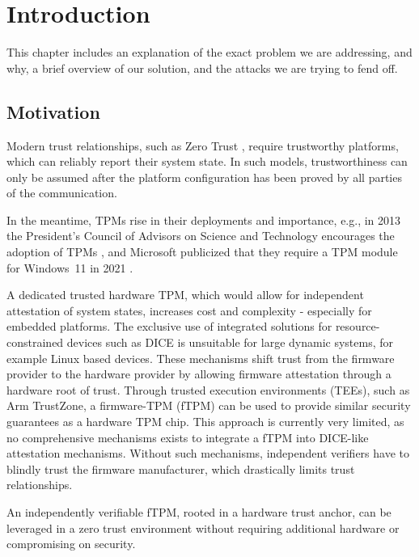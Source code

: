 
\chapter{Introduction}\label{chapter:introduction}

This chapter includes an explanation of the exact problem we are addressing, and why, a brief overview of our solution, and the attacks we are trying to fend off.


\section{Motivation}

Modern trust relationships, such as Zero Trust \cite{isaca2021}, require trustworthy platforms, which can reliably report their system state.
In such models, trustworthiness can only be assumed after the platform configuration has been proved by all parties of the communication.

In the meantime, TPMs rise in their deployments and importance, e.g., in 2013 the President's Council of Advisors on Science and Technology encourages the adoption of TPMs \cite{usa}, and Microsoft publicized that they require a TPM module for Windows~11 in 2021 \cite{win11req}.

A dedicated trusted hardware TPM, which would allow for independent attestation of system states, increases cost and complexity - especially for embedded platforms.
The exclusive use of integrated solutions for resource-constrained devices such as \ac{DICE} is unsuitable for large dynamic systems, for example Linux based devices.
These mechanisms shift trust from the firmware provider to the hardware provider by allowing firmware attestation through a hardware root of trust.
Through trusted execution environments (TEEs), such as Arm TrustZone, a firmware-TPM (fTPM) can be used to provide similar security guarantees as a hardware TPM chip.
This approach is currently very limited, as no comprehensive mechanisms exists to integrate a fTPM into DICE-like attestation mechanisms.
Without such mechanisms, independent verifiers have to blindly trust the firmware manufacturer, which drastically limits trust relationships.

An independently verifiable fTPM, rooted in a hardware trust anchor, can be leveraged in a zero trust environment without requiring additional hardware or compromising on security.

